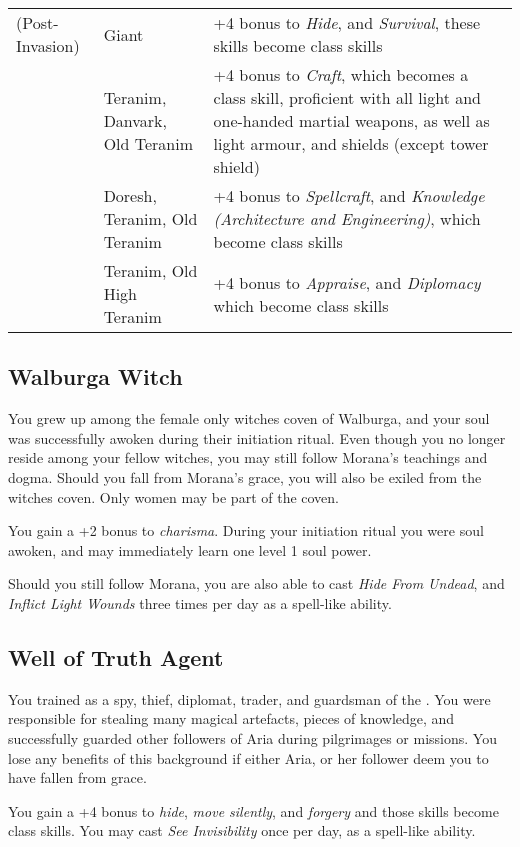\begin{table*}[!htb]
\begin{tabular}{l p{5cm} p{7cm}}
    \nameref{sec:Nen-Hilith} (Post-Invasion) & Giant                        & +4 bonus to \emph{Hide}, and \emph{Survival}, these skills become class skills \\
    \nameref{sec:Norbury}                    & Teranim, Danvark, Old Teranim&+4 bonus to \emph{Craft}, which becomes a class skill, proficient with all light and one-handed martial weapons, as well as light armour, and shields (except tower shield) \\
    \nameref{sec:Stenheim}                   & Doresh, Teranim, Old Teranim &+4 bonus to \emph{Spellcraft}, and \emph{Knowledge (Architecture and Engineering)}, which become class skills \\
    \nameref{sec:Tredegar}                   & Teranim, Old High Teranim    &+4 bonus to \emph{Appraise}, and \emph{Diplomacy} which become class skills \\
  \end{tabular}
\end{table*}

\subsection{Walburga Witch}
\label{sec:background:Walburga Witch}

You grew up among the female only witches coven of Walburga, and your soul was
successfully awoken during their initiation ritual. Even though you no longer
reside among your fellow witches, you may still follow Morana's teachings and
dogma. Should you fall from Morana's grace, you will also be exiled from the
witches coven. Only women may be part of the coven.

You gain a +2 bonus to \emph{charisma}. During your initiation ritual you were
soul awoken, and may immediately learn one level 1 soul power.

Should you still follow Morana, you are also able to cast \emph{Hide From
  Undead}, and \emph{Inflict Light Wounds} three times per day as a spell-like
ability.

\subsection{Well of Truth Agent}
\label{sec:Well of Truth Agent}

You trained as a spy, thief, diplomat, trader, and guardsman of the
. You were responsible for stealing many magical
artefacts, pieces of knowledge, and successfully guarded other followers of
Aria during pilgrimages or missions. You lose any benefits of this background
if either Aria, or her follower deem you to have fallen from grace.

You gain a +4 bonus to \emph{hide}, \emph{move silently}, and \emph{forgery}
and those skills become class skills. You may cast \emph{See Invisibility}
once per day, as a spell-like ability.
